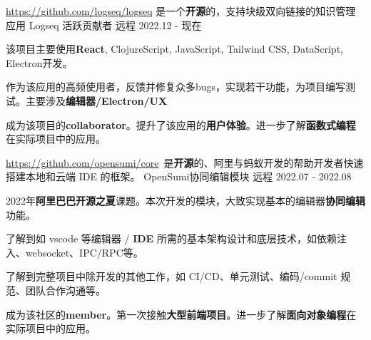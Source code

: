 

\begin{cventries}


    \cventry
    {\href{https://github.com/logseq/logseq}{https://github.com/logseq/logseq} 是一个\textbf{开源}的，支持块级双向链接的知识管理应用} %
    {Logseq 活跃贡献者} %
    {远程} %
    {2022.12 - 现在} %
    {
        \begin{cvitems} %
            \item {该项目主要使用\textbf{React}, ClojureScript, JavaScript, Tailwind CSS, DataScript, Electron开发。}
            \item {作为该应用的高频使用者，反馈并修复众多bugs，实现若干功能，为项目编写测试。主要涉及\textbf{编辑器/Electron/UX}}
            \item {成为该项目的\textbf{collaborator}。提升了该应用的\textbf{用户体验}。进一步了解\textbf{函数式编程}在实际项目中的应用。}
        \end{cvitems}
    }


    \cventry
    {\href{https://github.com/opensumi/core}{https://github.com/opensumi/core}\ 是\textbf{开源}的、阿里与蚂蚁开发的帮助开发者快速搭建本地和云端 IDE 的框架。} %
    {OpenSumi协同编辑模块} %
    {远程} %
    {2022.07 - 2022.08} %
    {
        \begin{cvitems} %
            \item {2022年\textbf{阿里巴巴开源之夏}课题。本次开发的模块，大致实现基本的编辑器\textbf{协同编辑}功能。}
            \item {了解到如 vscode 等编辑器 / \textbf{IDE} 所需的基本架构设计和底层技术，如依赖注入、websocket、IPC/RPC等。}
            \item {了解到完整项目中除开发的其他工作，如 CI/CD、单元测试、编码/commit 规范、团队合作沟通等。}
            \item {成为该社区的\textbf{member}。第一次接触\textbf{大型前端项目}。进一步了解\textbf{面向对象编程}在实际项目中的应用。}
        \end{cvitems}
    }


\end{cventries}
